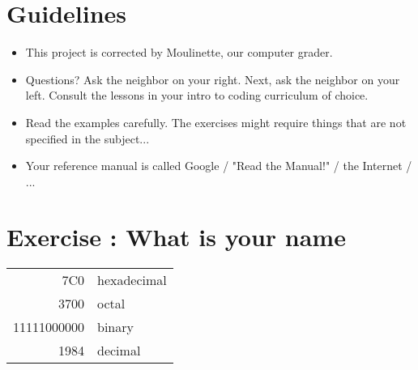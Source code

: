 \documentclass{42-en}
\begin{document}

\chapter{Guidelines}

\begin{itemize}

  \item This project is corrected by Moulinette, our computer grader.
 
  \item Questions? Ask the neighbor on your right. Next, ask the neighbor on your left. Consult the lessons in your intro to coding curriculum of choice.
  
  \item Read the examples carefully. The exercises might require things that are not specified in the subject...

  \item Your reference manual is called Google / "Read the Manual!" / the Internet / ...


\end{itemize}

\newpage


\startexercices



\chapter{Exercise \exercicenumber: What is your name}

\exnumber{\exercicenumber}
\begin{tabular}{|r|l|}
  \hline
  7C0 & hexadecimal \\
  3700 & octal \\ \cline{2-2}
  11111000000 & binary \\
  \hline \hline
  1984 & decimal \\
  \hline
\end{tabular}
\end{document}
